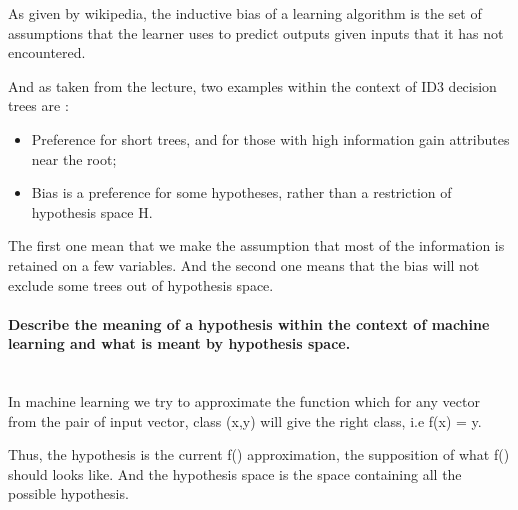 As given by wikipedia, the inductive bias of a learning algorithm is the set of assumptions that the learner uses to predict outputs given inputs that it has not encountered.

And as taken from the lecture, two examples within the context of ID3 decision trees are :
\begin{itemize}
  \item Preference for short trees, and for those with high information gain attributes near the root;
  \item Bias is a preference for some hypotheses, rather than a restriction of hypothesis space H.
\end{itemize}

The first one mean that we make the assumption that most of the information is retained on a few variables. And the second one means that the bias will not exclude some trees out of hypothesis space.

\paragraph{Describe the meaning of a hypothesis within the context of machine learning and what is meant by hypothesis space.\\\\}

In machine learning we try to approximate the function which for any vector from the pair of input vector, class (x,y) will give the right class, i.e f(x) = y.

Thus, the hypothesis is the current f() approximation, the supposition of what f() should looks like. And the hypothesis space is the space containing all the possible hypothesis.
